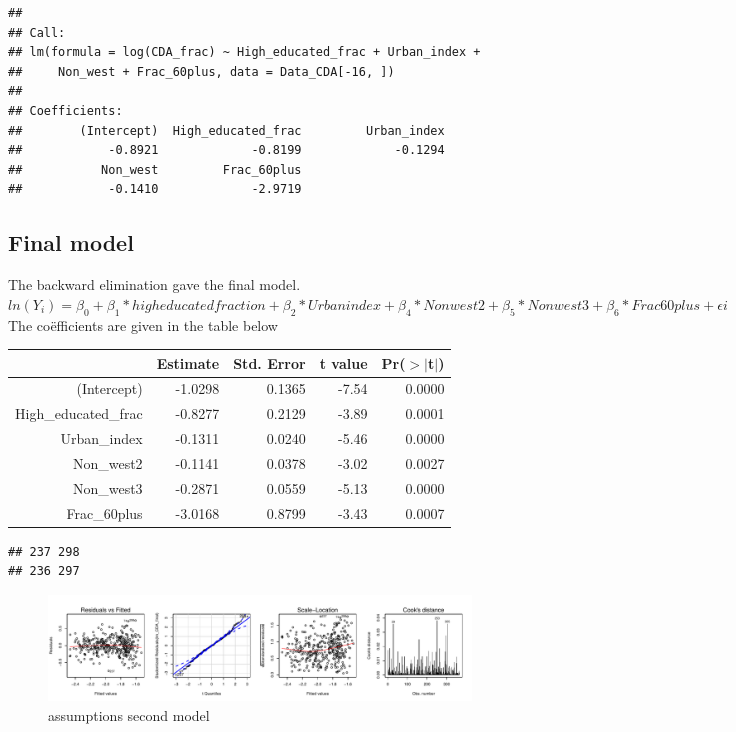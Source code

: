 \documentclass[11pt,]{article}
\begin{document}
\begin{verbatim}
## 
## Call:
## lm(formula = log(CDA_frac) ~ High_educated_frac + Urban_index + 
##     Non_west + Frac_60plus, data = Data_CDA[-16, ])
## 
## Coefficients:
##        (Intercept)  High_educated_frac         Urban_index  
##            -0.8921             -0.8199             -0.1294  
##           Non_west         Frac_60plus  
##            -0.1410             -2.9719
\end{verbatim}

\subsection{Final model}\label{final-model}

The backward elimination gave the final model.\\
\(ln(Y_i) = \beta_0 + \beta_1*high educated fraction + \beta_2*Urban index + \beta_4*Non west2 + \beta_5*Non west 3 + \beta_6*Frac 60plus + \epsilon i\)
The coëfficients are given in the table below

\begin{table}[ht]
\centering
\begin{tabular}{rrrrr}
  \hline
 & Estimate & Std. Error & t value & Pr($>$$|$t$|$) \\ 
  \hline
(Intercept) & -1.0298 & 0.1365 & -7.54 & 0.0000 \\ 
  High\_educated\_frac & -0.8277 & 0.2129 & -3.89 & 0.0001 \\ 
  Urban\_index & -0.1311 & 0.0240 & -5.46 & 0.0000 \\ 
  Non\_west2 & -0.1141 & 0.0378 & -3.02 & 0.0027 \\ 
  Non\_west3 & -0.2871 & 0.0559 & -5.13 & 0.0000 \\ 
  Frac\_60plus & -3.0168 & 0.8799 & -3.43 & 0.0007 \\ 
   \hline
\end{tabular}
\end{table}

\begin{verbatim}
## 237 298 
## 236 297
\end{verbatim}

\begin{figure}[H]

{\centering \includegraphics{lm_part_report_files/figure-latex/unnamed-chunk-5-1} 

}

\caption{\label{asm}assumptions second model}\label{fig:unnamed-chunk-5}
\end{figure}
\end{document}

